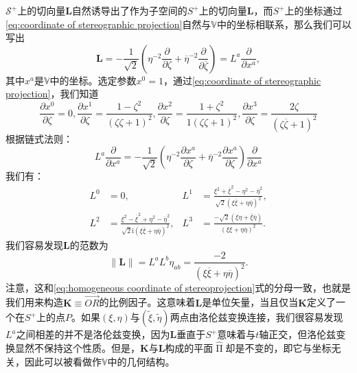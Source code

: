 $\mathcal{S}^{+}$上的切向量$\mathbf{L}$自然诱导出了作为子空间的$S^{+}$上的切向量$\boldsymbol{L}$，而$S^{+}$上的坐标通过\ref{eq:coordinate of stereographic projection}自然与$\mathbb{V}$中的坐标相联系，那么我们可以写出
\begin{equation*}
	\boldsymbol{L} =-\frac{1}{\sqrt{2}}\left( \eta ^{-2}\frac{\partial }{\partial \zeta } +\overline{\eta }^{-2}\frac{\partial }{\partial \overline{\zeta }}\right) =L^{a}\frac{\partial }{\partial x^{a}} ,
\end{equation*}
其中$x^{a}$是$\mathbb{V}$中的坐标。选定参数$x^{0} =1$，通过\ref{eq:coordinate of stereographic projection}，我们知道
\begin{equation*}
	\frac{\partial x^{0}}{\partial \zeta } =0,\frac{\partial x^{1}}{\partial \zeta } =\frac{1-\zeta ^{2}}{(\zeta \zeta +1)^{2}} ,\frac{\partial x^{2}}{\partial \zeta } =\frac{1+\zeta ^{2}}{1(\zeta \zeta +1)^{2}} ,\frac{\partial x^{3}}{\partial \zeta } =\frac{2\zeta }{(\zeta \overline{\zeta } +1)^{2}}
\end{equation*}
根据链式法则：
\begin{equation*}
	L^{a}\frac{\partial }{\partial x^{a}} =-\frac{1}{\sqrt{2}}\left( \eta ^{-2}\frac{\partial x^{a}}{\partial \zeta } +\overline{\eta }^{-2}\frac{\partial x^{a}}{\partial \zeta }\right)\frac{\partial }{\partial x^{a}}
\end{equation*}
我们有：
\begin{equation*}
	\begin{aligned}
		L^{0} & =0, & L^{1} & =\frac{\xi ^{2} +\overline{\xi }^{2} -\eta ^{2} -\overline{\eta }^{2}}{\sqrt{2} (\xi \overline{\xi } +\eta \overline{\eta } )^{2}} ,\\
		L^{2} & =\frac{\xi ^{2} -\overline{\xi }^{2} +\eta ^{2} -\overline{\eta }^{2}}{\sqrt{2}\mathrm{i} (\xi \overline{\xi } +\eta \overline{\eta } )^{2}} , & L^{3} & =\frac{-\sqrt{2} (\xi \eta +\overline{\xi }\overline{\eta } )}{(\xi \xi +\eta \overline{\eta } )^{2}} .
	\end{aligned}
\end{equation*}
我们容易发现$\boldsymbol{L}$的范数为
\begin{equation*}
	\| \boldsymbol{L} \| =L^{a} L^{b} \eta _{ab} =\frac{-2}{(\xi \overline{\xi } +\eta \overline{\eta } )^{2}} .
\end{equation*}
注意，这和\ref{eq:homogeneous coordinate of stereoprojection}式的分母一致，也就是我们用来构造$\boldsymbol{K} \equiv \overrightarrow{OR}$的比例因子。这意味着$\boldsymbol{L}$是单位矢量，当且仅当$\boldsymbol{K}$定义了一个在$S^{+}$上的点$P$。如果$( \xi ,\eta )$与$(\tilde{\xi } ,\tilde{\eta })$两点由洛伦兹变换连接，我们很容易发现$L^{a}$之间相差的并不是洛伦兹变换，因为$\boldsymbol{L}$垂直于$S^{+}$意味着与$t$轴正交，但洛伦兹变换显然不保持这个性质。但是，$\boldsymbol{K}$与$\boldsymbol{L}$构成的平面$\hat{\upPi }$却是不变的，即它与坐标无关，因此可以被看做作$\mathbb{V}$中的几何结构。

